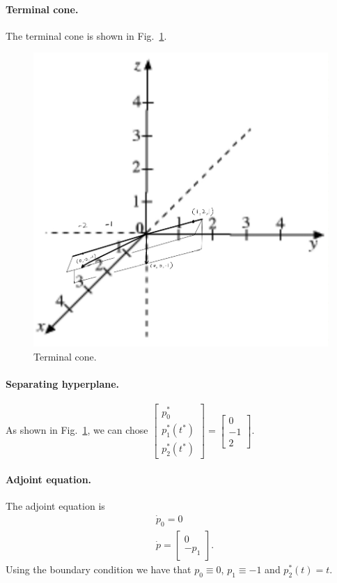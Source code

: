 \documentclass[11pt]{report}
\begin{document}
\paragraph{Terminal cone.} The terminal cone is shown in Fig.~\ref{fig:terminal_cone}.
\begin{figure}[H]
    \centering
    \includegraphics[width=\textwidth]{ECE553/hw6/IMG_0039.PNG}
    \caption{Terminal cone.}
    \label{fig:terminal_cone}
\end{figure}
\paragraph{Separating hyperplane.} As shown in Fig.~\ref{fig:terminal_cone}, we can chose $\begin{bmatrix}p_0^*\\p_1^*(t^*)\\p_2^*(t^*)\end{bmatrix} = \begin{bmatrix}0\\-1\\2\end{bmatrix}$.
\paragraph{Adjoint equation.} The adjoint equation is
\begin{align*}
& \dot{p}_0 = 0\\
& \dot{p} = \begin{bmatrix}0\\-p_1\end{bmatrix}.
\end{align*}
Using the boundary condition we have that $p_0 \equiv 0$, $p_1 \equiv -1$ and $p_2^*(t) = t$.
\end{document}
